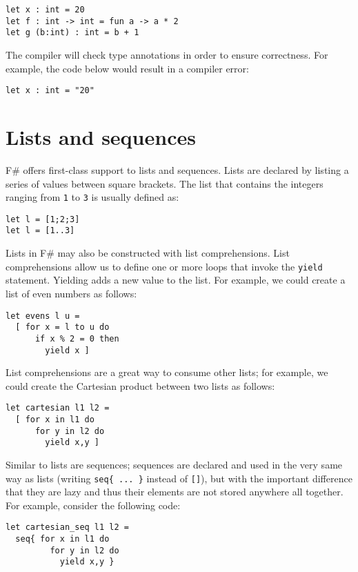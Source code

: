 \begin{lstlisting}
let x : int = 20
let f : int -> int = fun a -> a * 2
let g (b:int) : int = b + 1 
\end{lstlisting}

The compiler will check type annotations in order to ensure correctness. For example, the code below would result in a compiler error:

\begin{lstlisting}
let x : int = "20"
\end{lstlisting}

\section{Lists and sequences}
F\# offers first-class support to lists and sequences. Lists are declared by listing a series of values between square brackets. The list that contains the integers ranging from \texttt{1} to \texttt{3} is usually defined as:

\begin{lstlisting}
let l = [1;2;3]
let l = [1..3]
\end{lstlisting}

Lists in F\# may also be constructed with list comprehensions. List comprehensions allow us to define one or more loops that invoke the \texttt{yield} statement. Yielding adds a new value to the list. For example, we could create a list of even numbers as follows:

\begin{lstlisting}
let evens l u =  
  [ for x = l to u do  
      if x % 2 = 0 then
        yield x ]
\end{lstlisting}

List comprehensions are a great way to consume other lists; for example, we could create the Cartesian product between two lists as follows:

\begin{lstlisting}
let cartesian l1 l2 =  
  [ for x in l1 do   
      for y in l2 do
        yield x,y ]
\end{lstlisting}


Similar to lists are sequences; sequences are declared and used in the very same way as lists (writing \texttt{seq\{ ... \}} instead of \texttt{[]}), but with the important difference that they are lazy and thus their elements are not stored anywhere all together. For example, consider the following code:

\begin{lstlisting}
let cartesian_seq l1 l2 =  
  seq{ for x in l1 do   
         for y in l2 do
           yield x,y }
\end{lstlisting}

